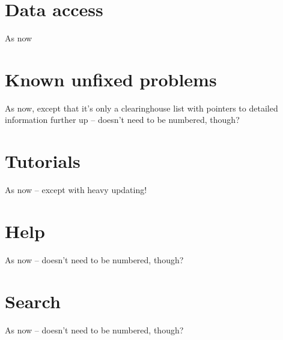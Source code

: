\documentclass{article}
\begin{document}
\section{Data access}

As now

\section{Known unfixed problems}

As now, except that it's only a clearinghouse list with pointers to
detailed information further up -- doesn't need to be numbered,
though?

\section{Tutorials}

As now -- except with heavy updating!

\section{Help}

As now -- doesn't need to be numbered, though?

\section{Search}

As now -- doesn't need to be numbered, though?
\end{document}
